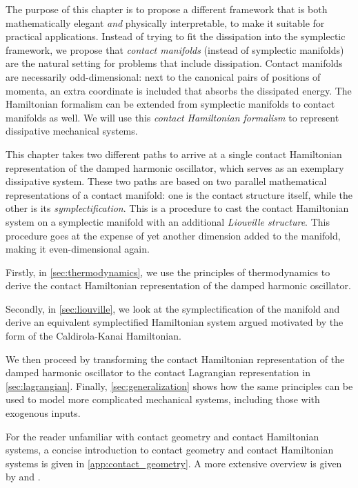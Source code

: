 The purpose of this chapter is to propose a different framework that is both mathematically elegant \emph{and} physically interpretable, to make it suitable for practical applications. Instead of trying to fit the dissipation into the symplectic framework, we propose that \emph{contact manifolds} (instead of symplectic manifolds) are the natural setting for problems that include dissipation. Contact manifolds are necessarily odd-dimensional: next to the canonical pairs of positions of momenta, an extra coordinate is included that absorbs the dissipated energy. The Hamiltonian formalism can be extended from symplectic manifolds to contact manifolds as well. We will use this \emph{contact Hamiltonian formalism} to represent dissipative mechanical systems.

This chapter takes two different paths to arrive at a single contact Hamiltonian representation of the damped harmonic oscillator, which serves as an exemplary dissipative system. These two paths are based on two parallel mathematical representations of a contact manifold: one is the contact structure itself, while the other is its \emph{symplectification}. This is a procedure to cast the contact Hamiltonian system on a symplectic manifold with an additional \emph{Liouville structure}. This procedure goes at the expense of yet another dimension added to the manifold, making it even-dimensional again.

Firstly, in \cref{sec:thermodynamics}, we use the principles of thermodynamics to derive the contact Hamiltonian representation of the damped harmonic oscillator. 

Secondly, in \cref{sec:liouville}, we look at the symplectification of the manifold and derive an equivalent symplectified Hamiltonian system argued motivated by the form of the Caldirola-Kanai Hamiltonian.

We then proceed by transforming the contact Hamiltonian representation of the damped harmonic oscillator to the contact Lagrangian representation in \cref{sec:lagrangian}. Finally, \cref{sec:generalization} shows how the same principles can be used to model more complicated mechanical systems, including those with exogenous inputs.

For the reader unfamiliar with contact geometry and contact Hamiltonian systems, a concise introduction to contact geometry and contact Hamiltonian systems is given in \cref{app:contact_geometry}. A more extensive overview is given by \citet{Geiges2008} and \citet{Libermann1987}.






